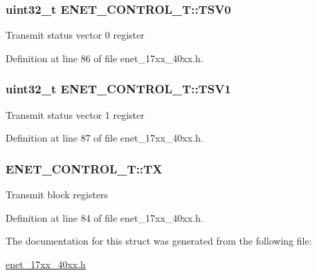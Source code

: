 \subsubsection[{\texorpdfstring{T\+S\+V0}{TSV0}}]{ uint32\+\_\+t E\+N\+E\+T\+\_\+\+C\+O\+N\+T\+R\+O\+L\+\_\+\+T\+::\+T\+S\+V0}\hypertarget{structENET__CONTROL__T_adfd0bf0a173cb107271eba4fa8f20de8}{}\label{structENET__CONTROL__T_adfd0bf0a173cb107271eba4fa8f20de8}
Transmit status vector 0 register 

Definition at line 86 of file enet\+\_\+17xx\+\_\+40xx.\+h.

\subsubsection[{\texorpdfstring{T\+S\+V1}{TSV1}}]{ uint32\+\_\+t E\+N\+E\+T\+\_\+\+C\+O\+N\+T\+R\+O\+L\+\_\+\+T\+::\+T\+S\+V1}\hypertarget{structENET__CONTROL__T_a03b03ad79457f3f25cc3d1d2d564310a}{}\label{structENET__CONTROL__T_a03b03ad79457f3f25cc3d1d2d564310a}
Transmit status vector 1 register 

Definition at line 87 of file enet\+\_\+17xx\+\_\+40xx.\+h.

\subsubsection[{\texorpdfstring{TX}{TX}}]{ E\+N\+E\+T\+\_\+\+C\+O\+N\+T\+R\+O\+L\+\_\+\+T\+::\+TX}\hypertarget{structENET__CONTROL__T_a1010eaf24cd6af0d6355b4cd34d8e90a}{}\label{structENET__CONTROL__T_a1010eaf24cd6af0d6355b4cd34d8e90a}
Transmit block registers 

Definition at line 84 of file enet\+\_\+17xx\+\_\+40xx.\+h.



The documentation for this struct was generated from the following file\+:\begin{DoxyCompactItemize}
\item 
\hyperlink{enet__17xx__40xx_8h}{enet\+\_\+17xx\+\_\+40xx.\+h}\end{DoxyCompactItemize}
